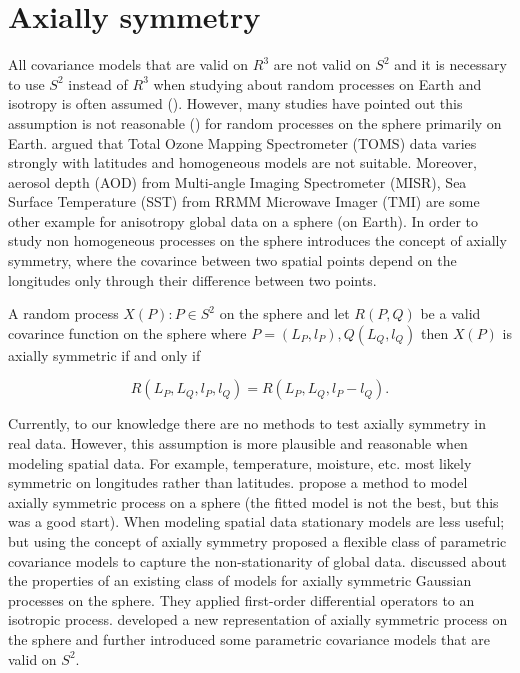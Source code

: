 		
		\section{Axially symmetry}
					
		All covariance models that are valid on $R^3$ are not valid on $S^2$ and it is necessary to use $S^2$ instead of $R^3$ when studying about random processes on Earth and isotropy is often assumed (\cite{Yadrenko1983, Yaglom1987}). However, many studies have pointed out this assumption is not reasonable (\cite{Stein2007, JunStein2008, BolinLindgren2011}) for random processes on the sphere primarily on Earth. \cite{Stein2007} argued that Total Ozone Mapping Spectrometer (TOMS) data varies strongly with latitudes and homogeneous models are not suitable. Moreover, aerosol depth (AOD) from Multi-angle Imaging Spectrometer (MISR), Sea Surface Temperature (SST) from RRMM Microwave Imager (TMI) are some other example for anisotropy global data on a sphere (on Earth). In order to study non homogeneous processes on the sphere \cite{Jones1963} introduces the concept of axially symmetry, where the covarince between two spatial points depend on the longitudes only through their difference  between two points.
					
		A random process $X(P): P\in S^2$ on the sphere and let $R(P,Q)$ be a valid covarince function on the sphere where $P=(L_P, l_P), Q(L_Q,l_Q)$ then $X(P)$ is axially symmetric if and only if
				
		\[
			R(L_P, L_Q, l_P, l_Q) = R(L_P, L_Q, l_P-l_Q).
		\]
				
		Currently, to our knowledge there are no methods to test axially symmetry in real data. However, this assumption is more plausible and reasonable when modeling spatial data. For example, temperature, moisture, etc. most likely symmetric on longitudes rather than latitudes. \cite{Stein2007} propose a method to model axially symmetric process on a sphere (the fitted model is not the best, but this was a good start). When modeling spatial data stationary models are less useful; but using the concept of axially symmetry \cite{JunStein2008} proposed a flexible class of parametric covariance models to capture the non-stationarity of global data. \cite{HitczenkoStein2012} discussed about the properties of an existing class of models for axially symmetric Gaussian processes on the sphere. They applied first-order differential operators to an isotropic process. \cite{Huang2012} developed a new representation of axially symmetric process on the sphere and further introduced some parametric covariance models that are valid on $S^2$.  \\
				
